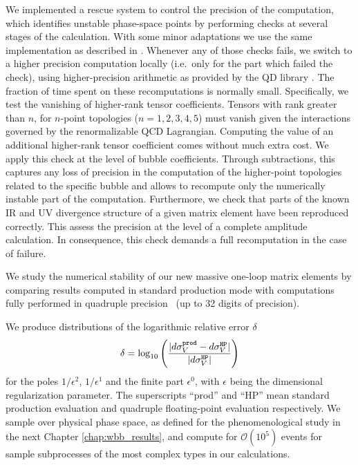 We implemented a rescue system to control the precision of the computation, which identifies unstable
phase-space points by performing checks at several
stages of the calculation. With some minor adaptations we use the same
implementation as described in \cite{Berger:2008sj,BH:W3jDistributions}. Whenever
any of those checks fails, we switch to a higher precision computation locally
(i.e.\ only for the part which failed the check), using
higher-precision arithmetic as provided by the QD library \cite{QD}. The fraction of time
spent on these recomputations is normally small. Specifically, we test the vanishing of higher-rank tensor
coefficients. Tensors with rank greater than $n$, for $n$-point topologies ($n=1,2,3,4,5$) must vanish given the interactions
governed by the renormalizable QCD Lagrangian. Computing the value of an
additional higher-rank tensor coefficient comes without much extra
cost. We apply this check at the level of bubble coefficients. Through
subtractions, this captures any loss of precision in the computation
of the higher-point topologies related to the specific bubble and
allows to recompute only the numerically instable part of the
computation. Furthermore, we check
that parts of the known IR and UV divergence structure
\cite{Catani:2000ef} of a given matrix element have been reproduced correctly.
This assess the precision at the level of a
complete amplitude calculation. In consequence, this check demands a full recomputation in the case of failure.


We study the numerical stability of our new massive
one-loop matrix elements by comparing results computed in standard
production mode with computations fully performed in
quadruple precision~\cite{QD} (up to 32 digits of precision).




We produce distributions of the logarithmic relative error $\delta$
\begin{align}
  \delta = \log_{10}\left(\frac{|d\sigma_{V}^{\text{\texttt{prod}}} -
      d\sigma_{V}^{\text{\texttt{HP}}}|}{|d\sigma_{V}^{\text{\texttt{HP}}}|}  \right)
\end{align}
for the poles $1/\epsilon^2$, $1/\epsilon^1$ and the finite part
$\epsilon^0$, with $\epsilon$ being the dimensional regularization
parameter. The superscripts ``prod'' and ``HP'' mean standard production evaluation and
quadruple floating-point evaluation respectively. We sample over physical
phase space, as defined for the phenomenological study in the next
Chapter \ref{chap:wbb_results}, and compute for $\mathcal{O}(10^5)$
events for sample subprocesses of the most complex types in our calculations. 


